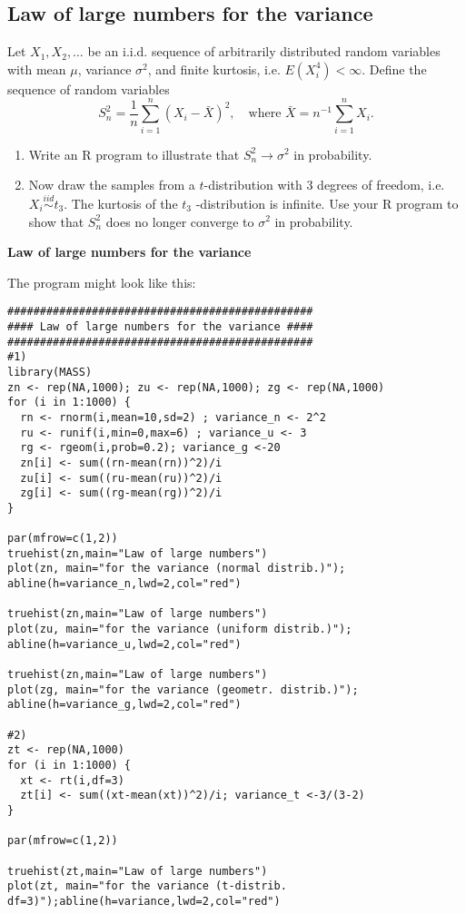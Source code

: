 \documentclass{article}
\begin{document}
\subsection{Law of large numbers for the variance}

Let $X_{1},X_{2},\ldots $ be an i.i.d. sequence of arbitrarily distributed
random variables with mean $\mu $, variance $\sigma ^{2}$, and finite
kurtosis, i.e. $E(X_{i}^{4})<\infty $. Define the sequence of random
variables%
\begin{equation*}
S_{n}^{2}=\frac{1}{n}\sum_{i=1}^{n}\left( X_{i}-\bar{X}\right) ^{2}, \quad \text{where } \bar{X}=n^{-1}\sum_{i=1}^{n}X_{i}.
\end{equation*}

\begin{enumerate}\setlength{\itemsep}{-2pt}
\item Write an R program to illustrate that $S_{n}^{2}\rightarrow \sigma
^{2} $ in probability.

\item Now draw the samples from a $t$-distribution with 3 degrees of
freedom, i.e. $X_{i}\overset{iid}{\sim }t_{3}$. The kurtosis of the $t_{3}$%
-distribution is infinite. Use your R program to show that $S_{n}^{2}$ does
no longer converge to $\sigma ^{2}$ in probability.
\end{enumerate}

\begin{solution}
\textbf{Law of large numbers for the variance}

The program might look like this:
\begin{verbatim}
###############################################
#### Law of large numbers for the variance ####
###############################################
#1)
library(MASS)
zn <- rep(NA,1000); zu <- rep(NA,1000); zg <- rep(NA,1000)
for (i in 1:1000) {
  rn <- rnorm(i,mean=10,sd=2) ; variance_n <- 2^2
  ru <- runif(i,min=0,max=6) ; variance_u <- 3
  rg <- rgeom(i,prob=0.2); variance_g <-20
  zn[i] <- sum((rn-mean(rn))^2)/i
  zu[i] <- sum((ru-mean(ru))^2)/i
  zg[i] <- sum((rg-mean(rg))^2)/i
}

par(mfrow=c(1,2))
truehist(zn,main="Law of large numbers")
plot(zn, main="for the variance (normal distrib.)"); abline(h=variance_n,lwd=2,col="red")

truehist(zn,main="Law of large numbers")
plot(zu, main="for the variance (uniform distrib.)"); abline(h=variance_u,lwd=2,col="red")

truehist(zn,main="Law of large numbers")
plot(zg, main="for the variance (geometr. distrib.)"); abline(h=variance_g,lwd=2,col="red")

#2)
zt <- rep(NA,1000)
for (i in 1:1000) {
  xt <- rt(i,df=3)
  zt[i] <- sum((xt-mean(xt))^2)/i; variance_t <-3/(3-2)
}

par(mfrow=c(1,2))

truehist(zt,main="Law of large numbers")
plot(zt, main="for the variance (t-distrib. df=3)");abline(h=variance,lwd=2,col="red")
\end{verbatim}
\end{solution}
\end{document}
